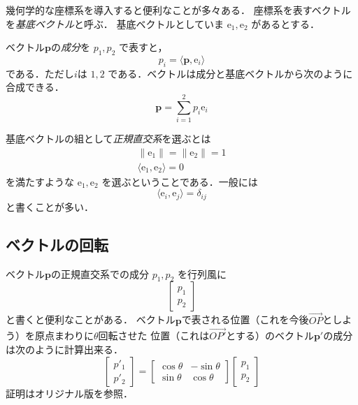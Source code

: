 \documentclass{jsbook}
\newcommand{\keyword}[1]{\emph{#1}}
\newcommand{\norm}[1]{\|{#1}\|}
\newcommand{\bvec}[1]{\boldsymbol{#1}}
\newcommand{\ve}{\mathrm{e}}
\begin{document}
幾何学的な座標系を導入すると便利なことが多々ある．
座標系を表すベクトルを\keyword{基底ベクトル}と呼ぶ．
基底ベクトルとしていま $\ve_1,\ve_2$ があるとする．

ベクトル$\bvec{p}$の\keyword{成分}を $p_1,p_2$ で表すと，
\begin{equation}
p_i=\langle\bvec{p},\ve_i\rangle
\end{equation}
である．ただし$i$は $1,2$ である．ベクトルは成分と基底ベクトルから次のように合成できる．
\begin{equation}
\bvec{p}=\sum_{i=1}^2p_i\ve_i
\end{equation}

基底ベクトルの組として\keyword{正規直交系}を選ぶとは
\begin{gather}
\norm{\ve_1}=\norm{\ve_2}=1\\
\langle\ve_1,\ve_2\rangle=0
\end{gather}
を満たすような $\ve_1,\ve_2$ を選ぶということである．一般には
\begin{equation}
\langle\ve_i,\ve_j\rangle=\delta_{ij}
\end{equation}
と書くことが多い．

\subsection{ベクトルの回転}

ベクトル$\bvec{p}$の正規直交系での成分 $p_1,p_2$ を行列風に
\begin{equation}
\begin{bmatrix}p_1\\p_2\end{bmatrix}
\end{equation}
と書くと便利なことがある．
ベクトル$\bvec{p}$で表される位置（これを今後$\overrightarrow{OP}$としよう）を原点まわりに$\theta$回転させた
位置（これは$\overrightarrow{OP'}$とする）のベクトル$\bvec{p}'$の成分は次のように計算出来る．
\begin{equation}
\begin{bmatrix}p'_1\\p'_2\end{bmatrix}=\begin{bmatrix}\cos\theta&-\sin\theta\\\sin\theta&\cos\theta\end{bmatrix}\begin{bmatrix}p_1\\p_2\end{bmatrix}
\end{equation}
証明はオリジナル版を参照．
\end{document}
